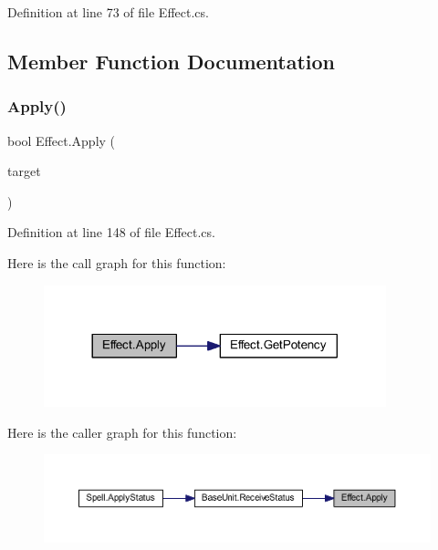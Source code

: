 Definition at line 73 of file Effect.\+cs.



\subsection{Member Function Documentation}
\mbox{\label{class_effect_a81689f18a4d3ae57ca39b71592be76ef}} 
\subsubsection{\texorpdfstring{Apply()}{Apply()}}
{\footnotesize\ttfamily bool Effect.\+Apply (\begin{DoxyParamCaption}\item[{\mbox{\hyperlink{class_base_unit}{Base\+Unit}}}]{target }\end{DoxyParamCaption})}



Definition at line 148 of file Effect.\+cs.

Here is the call graph for this function\+:
\nopagebreak
\begin{figure}[H]
\begin{center}
\leavevmode
\includegraphics[width=281pt]{class_effect_a81689f18a4d3ae57ca39b71592be76ef_cgraph}
\end{center}
\end{figure}
Here is the caller graph for this function\+:
\nopagebreak
\begin{figure}[H]
\begin{center}
\leavevmode
\includegraphics[width=350pt]{class_effect_a81689f18a4d3ae57ca39b71592be76ef_icgraph}
\end{center}
\end{figure}
\mbox{\label{class_effect_a5af13ce8f65df2bfbba422a46e627fc0}} 
